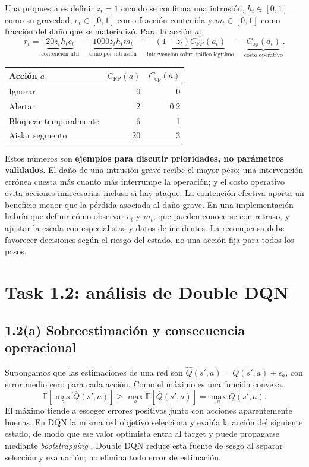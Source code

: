 \documentclass[11pt,a4paper]{article}
\begin{document}
Una propuesta es definir $z_t=1$ cuando se confirma una intrusión, $h_t\in[0,1]$ como su gravedad, $e_t\in[0,1]$ como fracción contenida y $m_t\in[0,1]$ como fracción del daño que se materializó. Para la acción $a_t$:
\begin{equation}
 r_t=\underbrace{20z_th_te_t}_{\text{contención útil}}
 -\underbrace{1000z_th_tm_t}_{\text{daño por intrusión}}
 -\underbrace{(1-z_t)C_{\mathrm{FP}}(a_t)}_{\text{intervención sobre tráfico legítimo}}
 -\underbrace{C_{\mathrm{op}}(a_t)}_{\text{costo operativo}}.
 \label{eq:reward}
\end{equation}
\begin{center}
\small
\begin{tabular}{lrr}
\toprule
Acción $a$ & $C_{\mathrm{FP}}(a)$ & $C_{\mathrm{op}}(a)$\\
\midrule
Ignorar & 0 & 0\\
Alertar & 2 & 0.2\\
Bloquear temporalmente & 6 & 1\\
Aislar segmento & 20 & 3\\
\bottomrule
\end{tabular}
\end{center}
Estos números son \textbf{ejemplos para discutir prioridades, no parámetros validados}. El daño de una intrusión grave recibe el mayor peso; una intervención errónea cuesta más cuanto más interrumpe la operación; y el costo operativo evita acciones innecesarias incluso si hay ataque. La contención efectiva aporta un beneficio menor que la pérdida asociada al daño grave. En una implementación habría que definir cómo observar $e_t$ y $m_t$, que pueden conocerse con retraso, y ajustar la escala con especialistas y datos de incidentes. La recompensa debe favorecer decisiones según el riesgo del estado, no una acción fija para todos los pasos.

\section{Task 1.2: análisis de Double DQN}

\subsection*{1.2(a) Sobreestimación y consecuencia operacional}
Supongamos que las estimaciones de una red son $\widehat Q(s',a)=Q(s',a)+\epsilon_a$, con error medio cero para cada acción. Como el máximo es una función convexa,
\begin{equation}
 \mathbb E\!\left[\max_a\widehat Q(s',a)\right]
 \geq \max_a\mathbb E[\widehat Q(s',a)]
 =\max_a Q(s',a).
\end{equation}
El máximo tiende a escoger errores positivos junto con acciones aparentemente buenas. En DQN la misma red objetivo selecciona y evalúa la acción del siguiente estado, de modo que ese valor optimista entra al target y puede propagarse mediante \emph{bootstrapping} \cite{diapositivas}. Double DQN reduce esta fuente de sesgo al separar selección y evaluación; no elimina todo error de estimación.
\end{document}

